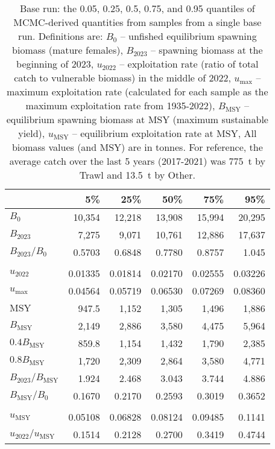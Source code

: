 \documentclass[11pt]{book}
\begin{document}
\setlength{\tabcolsep}{6pt}
\begin{table}[ht]
\centering
\caption{Base run: the 0.05, 0.25, 0.5, 0.75, and 0.95 quantiles of MCMC-derived quantities from \Nbase{} samples  from a single base run. Definitions are: $B_0$ -- unfished equilibrium spawning biomass (mature females), $B_{2023}$ -- spawning biomass at the beginning of 2023, $u_{2022}$ -- exploitation rate (ratio of total catch to vulnerable biomass) in the middle of 2022, $u_\text{max}$ -- maximum exploitation rate (calculated for each sample as the maximum exploitation rate from 1935-2022), $B_\text{MSY}$ -- equilibrium spawning biomass at MSY (maximum sustainable yield), $u_\text{MSY}$ -- equilibrium exploitation rate at MSY, All biomass values (and MSY) are in tonnes. For reference, the average catch over the last 5 years (2017-2021) was 775~t by Trawl and 13.5~t by Other.} 
\label{tab:car.base.rfpt}
\begin{tabular}{lrrrrr}
  \\[-1.0ex] \hline
 & 5\% & 25\% & 50\% & 75\% & 95\% \\ 
  \hline
$B_{0}$ & 10,354 & 12,218 & 13,908 & 15,994 & 20,295 \\ 
  $B_{2023}$ & 7,275 & 9,071 & 10,761 & 12,886 & 17,637 \\ 
  $B_{2023}/B_{0}$ & 0.5703 & 0.6848 & 0.7780 & 0.8757 & 1.045 \\ 
   \hdashline \\[-1.75ex]$u_{2022}$ & 0.01335 & 0.01814 & 0.02170 & 0.02555 & 0.03226 \\ 
  $u_\text{max}$ & 0.04564 & 0.05719 & 0.06530 & 0.07269 & 0.08360 \\ 
   \hline
$\text{MSY}$ & 947.5 & 1,152 & 1,305 & 1,496 & 1,886 \\ 
  $B_\text{MSY}$ & 2,149 & 2,886 & 3,580 & 4,475 & 5,964 \\ 
  $0.4B_{\text{MSY}}$ & 859.8 & 1,154 & 1,432 & 1,790 & 2,385 \\ 
  $0.8B_{\text{MSY}}$ & 1,720 & 2,309 & 2,864 & 3,580 & 4,771 \\ 
  $B_{2023}/B_\text{MSY}$ & 1.924 & 2.468 & 3.043 & 3.744 & 4.886 \\ 
  $B_\text{MSY}/B_{0}$ & 0.1670 & 0.2170 & 0.2593 & 0.3019 & 0.3652 \\ 
   \hdashline \\[-1.75ex]$u_\text{MSY}$ & 0.05108 & 0.06828 & 0.08124 & 0.09485 & 0.1141 \\ 
  $u_{2022}/u_\text{MSY}$ & 0.1514 & 0.2128 & 0.2700 & 0.3419 & 0.4744 \\ 
   \hline
\end{tabular}
\end{table}
\setlength{\tabcolsep}{2pt}


\end{document}
